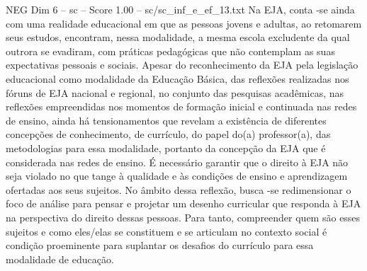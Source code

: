 \begin{textsample}{NEG Dim 6 – sc – Score 1.00 – sc/sc\_inf\_e\_ef\_13.txt}
Na EJA, conta -se ainda com uma realidade educacional em que as pessoas jovens e adultas, ao retomarem seus estudos, encontram, nessa modalidade, a mesma escola excludente da qual outrora se evadiram, com práticas pedagógicas que não contemplam as suas expectativas pessoais e sociais.
Apesar do reconhecimento da EJA pela legislação educacional como modalidade da Educação Básica, das reflexões realizadas nos fóruns de EJA nacional e regional, no conjunto das pesquisas acadêmicas, nas reflexões empreendidas nos momentos de formação inicial e continuada nas redes de ensino, ainda há tensionamentos que revelam a existência de diferentes concepções de conhecimento, de currículo, do papel do(a) professor(a), das metodologias para essa modalidade, portanto da concepção da EJA que é considerada nas redes de ensino.
É necessário garantir que o direito à EJA não seja violado no que tange à qualidade e às condições de ensino e aprendizagem ofertadas aos seus sujeitos.
No âmbito dessa reflexão, busca -se redimensionar o foco de análise para pensar e projetar um desenho curricular que responda à EJA na perspectiva do direito dessas pessoas.
Para tanto, compreender quem são esses sujeitos e como eles/elas se constituem e se articulam no contexto social é condição proeminente para suplantar os desafios do currículo para essa modalidade de educação.

\end{textsample}
